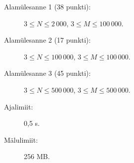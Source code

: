 \documentclass{boi2014-et}
\begin{document}
    \Scoring

    \begin{description}
        \item[Alamülesanne 1 (38 punkti):] $3 \le N \le 2\,000$, $3 \le M \le 100\,000$.
        \item[Alamülesanne 2 (17 punkti):] $3 \le N \le 100\,000$, $3 \le M \le 100\,000$.
        \item[Alamülesanne 3 (45 punkti):] $3 \le N \le 500\,000$, $3 \le M \le 500\,000$.
    \end{description}

    \Constraints

    \begin{description}
        \item[Ajalimiit:] 0,5 s.
        \item[Mälulimiit:] 256 MB.
    \end{description}
\end{document}

